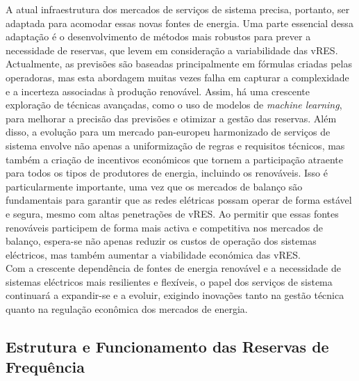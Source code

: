 A atual infraestrutura dos mercados de serviços de sistema precisa, portanto, ser adaptada para acomodar essas novas fontes de energia. Uma parte essencial dessa adaptação é o desenvolvimento de métodos mais robustos para prever a necessidade de reservas, que levem em consideração a variabilidade das \gls{vRES}. Actualmente, as previsões são baseadas principalmente em fórmulas criadas pelas operadoras, mas esta abordagem muitas vezes falha em capturar a complexidade e a incerteza associadas à produção renovável. Assim, há uma crescente exploração de técnicas avançadas, como o uso de modelos de \textit{machine learning}, para melhorar a precisão das previsões e otimizar a gestão das reservas.
Além disso, a evolução para um mercado pan-europeu harmonizado de serviços de sistema envolve não apenas a uniformização de regras e requisitos técnicos, mas também a criação de incentivos económicos que tornem a participação atraente para todos os tipos de produtores de energia, incluindo os renováveis. Isso é particularmente importante, uma vez que os mercados de balanço são fundamentais para garantir que as redes elétricas possam operar de forma estável e segura, mesmo com altas penetrações de \gls{vRES}. Ao permitir que essas fontes renováveis participem de forma mais activa e competitiva nos mercados de balanço, espera-se não apenas reduzir os custos de operação dos sistemas eléctricos, mas também aumentar a viabilidade económica das \gls{vRES}.\\
Com a crescente dependência de fontes de energia renovável e a necessidade de sistemas eléctricos mais resilientes e flexíveis, o papel dos serviços de sistema continuará a expandir-se e a evoluir, exigindo inovações tanto na gestão técnica quanto na regulação econômica dos mercados de energia.\\


\subsection{Estrutura e Funcionamento das Reservas de Frequência \label{se:reservas_freq}}


